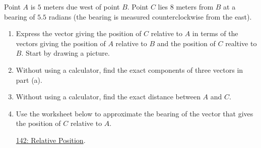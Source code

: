 \documentclass{ximera}
\begin{document}
\begin{question}  \label{Q9dferevdeewDSFD}
Point $A$ is $5$ meters due west of point $B$. Point $C$ lies $8$ meters from $B$ at a bearing of $5.5$ radians (the bearing is measured counterclockwise from the east).

\begin{enumerate}
\item Express the vector giving the position of $C$ relative to $A$ in terms of the vectors giving the position of $A$ relative to $B$ and the position of $C$ realtive to $B$. Start by drawing a picture.

\item Without using a calculator, find the exact components of three vectors in part (a).

\item Without using a calculator, find the exact distance between $A$ and $C$.

\item Use the worksheet below to approximate the bearing of the vector that gives the position of $C$ relative to $A$.

\href{https://www.geogebra.org/classic/bhdsgxtx}{142: Relative Position}.

 
\begin{onlineOnly}
    \begin{center}
\end{center}
\end{onlineOnly}
\end{enumerate}
\end{question}
\end{document}

